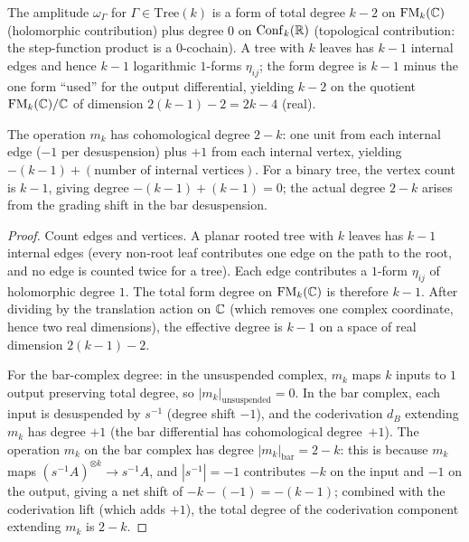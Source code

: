 \begin{proposition}
The amplitude $\omega_\Gamma$ for $\Gamma \in \mathrm{Tree}(k)$
is a form of total degree $k - 2$ on $\operatorname{FM}_k(\mathbb{C})$ (holomorphic
contribution) plus degree $0$ on $\operatorname{Conf}_k(\mathbb{R})$ (topological
contribution: the step-function product is a $0$-cochain).
A tree with $k$ leaves has $k - 1$ internal edges and hence
$k - 1$ logarithmic $1$-forms $\eta_{ij}$; the form degree is
$k - 1$ minus the one form ``used'' for the output differential,
yielding $k - 2$ on the quotient $\operatorname{FM}_k(\mathbb{C})/\mathbb{C}$ of dimension
$2(k-1) - 2 = 2k - 4$ (real).

The operation $m_k$ has cohomological degree $2 - k$:
one unit from each internal edge ($-1$ per desuspension) plus
$+1$ from each internal vertex, yielding
$-(k-1) + (\text{number of internal vertices})$. For a
binary tree, the vertex count is $k - 1$, giving degree
$-(k-1) + (k-1) = 0$; the actual degree $2-k$ arises from
the grading shift in the bar desuspension.
\end{proposition}

\begin{proof}
Count edges and vertices. A planar rooted tree with $k$ leaves
has $k - 1$ internal edges (every non-root leaf contributes one
edge on the path to the root, and no edge is counted twice for a
tree). Each edge contributes a $1$-form $\eta_{ij}$ of
holomorphic degree $1$. The total form degree on $\operatorname{FM}_k(\mathbb{C})$
is therefore $k - 1$. After dividing by the translation action on
$\mathbb{C}$ (which removes one complex coordinate, hence two real
dimensions), the effective degree is $k - 1$ on a space of real
dimension $2(k - 1) - 2$.

For the bar-complex degree: in the unsuspended complex, $m_k$
maps $k$ inputs to $1$ output preserving total degree, so
$|m_k|_{\mathrm{unsuspended}} = 0$. In the bar complex,
each input is desuspended by $s^{-1}$ (degree shift $-1$),
and the coderivation $d_B$ extending $m_k$ has degree $+1$
(the bar differential has cohomological degree~$+1$).
The operation $m_k$ on the bar complex has degree
$|m_k|_{\mathrm{bar}} = 2 - k$: this is because $m_k$ maps
$(s^{-1}A)^{\otimes k} \to s^{-1}A$, and
$|s^{-1}| = -1$ contributes $-k$ on the input and $-1$ on the
output, giving a net shift of $-k - (-1) = -(k-1)$; combined
with the coderivation lift (which adds $+1$), the total degree
of the coderivation component extending $m_k$ is $2 - k$.
\end{proof}

